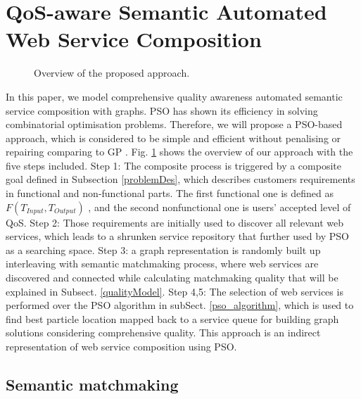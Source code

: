 \documentclass{llncs}
\begin{document}
\section{QoS-aware Semantic Automated Web Service Composition}\label{qswsc_approach}
\begin{figure}[h]
\centerline{
}
 \caption{Overview of the proposed approach.}
 \label{overview}
\end{figure}
In this paper, we model comprehensive quality awareness automated semantic service composition with graphs. PSO has shown its efficiency in solving combinatorial optimisation problems. Therefore, we will propose a PSO-based approach, which is considered to be simple and efficient without penalising or repairing comparing to GP \cite{da2014graph}. Fig. \ref{overview} shows the overview of our approach with the five steps included. Step 1: The composite process is triggered by a composite goal defined in Subsection \ref{problemDes}, which describes customers requirements in functional and non-functional parts. The first functional one is defined as $F(T_{Input}, T_{Output})$ , and the second nonfunctional one is users' accepted level of QoS. Step 2: Those requirements are initially used to discover all relevant web services, which leads to a shrunken service repository that further used by PSO as a searching space. Step 3: a graph representation is randomly built up interleaving with semantic matchmaking process, where web services are discovered and connected while calculating matchmaking quality that will be explained in Subsect. \ref{qualityModel}. Step 4,5: The selection of web services is performed over the PSO algorithm in subSect. \ref{pso_algorithm}, which is used to find best particle location mapped back to a service queue for building graph solutions considering comprehensive quality. This approach \cite{da2016particle} is an indirect representation of web service composition using PSO.
\subsection{Semantic matchmaking} \label{semantic_matchmaking}
\end{document}

